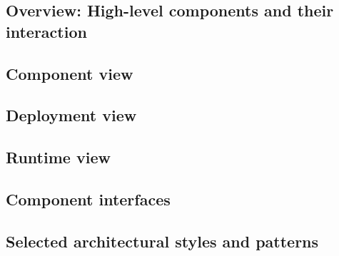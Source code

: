 \subsection{Overview: High-level components and their interaction}
\subsection{Component view}
\subsection{Deployment view}
\subsection{Runtime view}
\label{subsec:runtimeView}
\subsection{Component interfaces}
\subsection{Selected architectural styles and patterns}